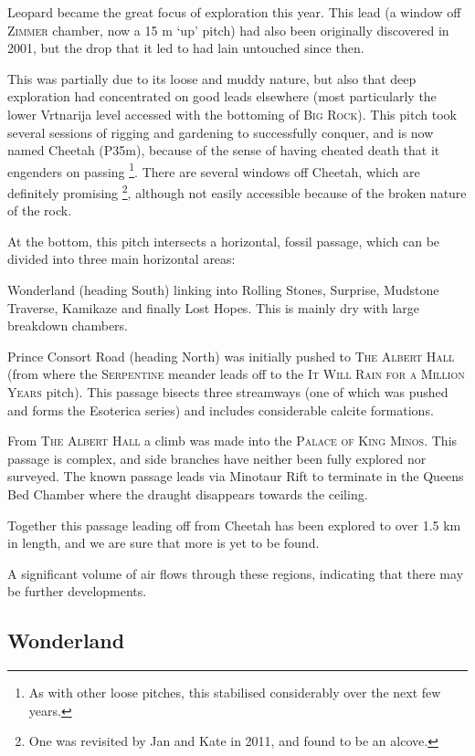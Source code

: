 Leopard became the great focus of exploration this year. This lead (a
window off \textsc{Zimmer} chamber, now a 15 m `up' pitch) had also been
originally discovered in 2001, but the drop that it led to had lain
untouched since then.

This was partially due to its loose and muddy nature, but also that deep
exploration had concentrated on good leads elsewhere (most particularly
the lower Vrtnarija level accessed with the bottoming of
\textsc{Big Rock}). This pitch took several sessions of rigging and
gardening to successfully conquer, and is now named Cheetah (P35m),
because of the sense of having cheated death that it engenders on
passing
\footnote{As with other loose pitches, this stabilised considerably over
the next few years.}. There are several windows off Cheetah, which are
definitely promising
\footnote{One was revisited by Jan and Kate in 2011, and found to be an alcove.},
although not easily accessible because of the broken nature of the rock.

At the bottom, this pitch intersects a horizontal, fossil passage, which
can be divided into three main horizontal areas:

Wonderland (heading South) linking into Rolling Stones, Surprise,
Mudstone Traverse, Kamikaze and finally Lost Hopes. This is mainly dry
with large breakdown chambers.

Prince Consort Road (heading North) was initially pushed to
\textsc{The Albert
Hall} (from where the \textsc{Serpentine} meander leads off to the
\textsc{It
Will Rain for a Million Years} pitch). This passage bisects three
streamways (one of which was pushed and forms the Esoterica series) and
includes considerable calcite formations.

From \textsc{The Albert Hall} a climb was made into the
\textsc{Palace of King Minos}. This passage is complex, and side
branches have neither been fully explored nor surveyed. The known
passage leads via Minotaur Rift to terminate in the Queens Bed Chamber
where the draught disappears towards the ceiling.

Together this passage leading off from Cheetah has been explored to over
1.5 km in length, and we are sure that more is yet to be found.

A significant volume of air flows through these regions, indicating that
there may be further developments.

\hypertarget{wonderland}{%
\subsection{Wonderland}\label{wonderland}}


